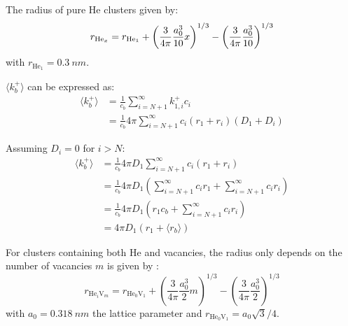The radius of pure \gls{He} clusters  given by:
\begin{equation}
    r_{\mathrm{He}_x} = r_{\mathrm{He}_1} + \left(\frac{3}{4\pi} \frac{a_0^3}{10} x \right)^{1/3} - \left( \frac{3}{4\pi} \frac{a_0^3}{10} \right)^{1/3}
    \labeq{radius pure He}
\end{equation}
with $r_{\mathrm{He}_1} = \SI{0.3}{nm}$.

$\langle k_b^+ \rangle$ can be expressed as:
\begin{subequations}
    \begin{align}
        \langle k_b^+ \rangle &= \frac{1}{c_b}\sum\limits_{i=N+1}^\infty k_{1,i}^+ c_i\\
        &= \frac{1}{c_b} 4 \pi \sum\limits_{i=N+1}^\infty c_i  (r_1 + r_i) (D_1 + D_i)
    \end{align}
\end{subequations}

Assuming $D_i = 0$ for $i > N$:
\begin{subequations}
    \begin{align}
        \langle k_b^+ \rangle &= \frac{1}{c_b} 4 \pi D_1  \sum\limits_{i=N+1}^\infty c_i (r_1 + r_i) \\
        &= \frac{1}{c_b} 4 \pi D_1 \left(\sum\limits_{i=N+1}^\infty c_i r_1 + \sum\limits_{i=N+1}^\infty c_i r_i \right)\\
        &= \frac{1}{c_b} 4 \pi D_1 \left(r_1 c_b  + \sum\limits_{i=N+1}^\infty c_i r_i \right)\\
        &= 4 \pi D_1 (r_1 + \langle r_b \rangle) 
    \end{align}
\end{subequations}

For clusters containing both \gls{He} and vacancies, the radius only depends on the number of vacancies $m$ is given by \cite{faney_spatially_2015}:
\begin{equation}
    r_{\mathrm{He}_i\mathrm{V}_m} = r_{\mathrm{He}_0 \mathrm{V}_1} + \left(\frac{3}{4 \pi} \frac{a_0^3}{2} m \right)^{1/3} - \left(\frac{3}{4 \pi} \frac{a_0^3}{2} \right)^{1/3}
\end{equation}
with $a_0 = \SI{0.318}{nm}$ the lattice parameter and $r_{\mathrm{He}_0 \mathrm{V}_1} =  a_0 \sqrt{3}/4$.


